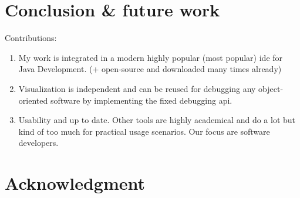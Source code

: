 \documentclass[conference]{IEEEtran}
\begin{document}

\section{Conclusion \& future work} \label{sec:conclusion}
Contributions:
\begin{enumerate}
    \item My work is integrated in a modern highly popular (most popular) \gls*{ide} for Java Development. (+ open-source and downloaded many times already)
    \item Visualization is independent and can be reused for debugging any object-oriented software by implementing the fixed debugging api.
    \item Usability and up to date. Other tools are highly academical and do a lot but kind of too much for practical usage scenarios. Our focus are software developers.
\end{enumerate}


\cite{krauterBehavioralConsistencyHeterogeneous2021}

\section*{Acknowledgment}

\newpage



\end{document}
